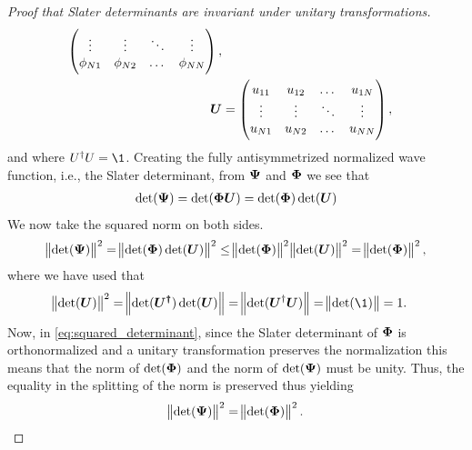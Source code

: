 \begin{proof}[Proof that Slater determinants are invariant under unitary
            transformations]
\begin{align}
\begin{pmatrix}
                    \vdots & \vdots & \ddots & \vdots \\
                    \phi_{N1} & \phi_{N2} & \dots & \phi_{NN}
                \end{pmatrix}, \\
                \boldsymbol{U}
                &= \begin{pmatrix}
                    u_{11} & u_{12} & \dots & u_{1N} \\
                    \vdots & \vdots & \ddots & \vdots \\
                    u_{N1} & u_{N2} & \dots & u_{NN}
                \end{pmatrix},
            \end{align}
            and where $U^{\dagger}U = \1$. Creating the fully antisymmetrized
            normalized wave function, i.e., the Slater determinant, from
            $\boldsymbol{\Psi}$ and $\boldsymbol{\Phi}$ we see that
            \begin{gather}
                \det(\boldsymbol{\Psi}) = \det(\boldsymbol{\Phi}\boldsymbol{U})
                = \det(\boldsymbol{\Phi})\det(\boldsymbol{U})
            \end{gather}
            We now take the squared norm on both sides.
            \begin{align}
                \norm{\det(\boldsymbol{\Psi})}^2
                = \norm{\det(\boldsymbol{\Phi})\det(\boldsymbol{U})}^2
                \leq
                \norm{\det(\boldsymbol{\Phi})}^2\norm{\det(\boldsymbol{U})}^2
                = \norm{\det(\boldsymbol{\Phi})}^2,
                \label{eq:squared_determinant}
            \end{align}
            where we have used that
            \begin{align}
                \norm{\det(\vfg{U})}^2
                &= \norm{\det(\vfg{U^{\dagger}})\det(\vfg{U})}
                = \norm{\det(\vfg{U}^{\dagger}\vfg{U})}
                = \norm{\det(\1)} = 1.
            \end{align}
            Now, in \autoref{eq:squared_determinant}, since the Slater
            determinant of $\boldsymbol{\Phi}$ is orthonormalized and a unitary
            transformation preserves the normalization this means that the norm
            of $\det(\boldsymbol{\Phi})$ and the norm of $\det(\boldsymbol{\Psi})$ must be
            unity.  Thus, the equality in the splitting of the norm is preserved
            thus yielding
            \begin{gather}
                \norm{\det(\boldsymbol{\Psi})}^2 = \norm{\det(\boldsymbol{\Phi})}^2.
            \end{gather}
        \end{proof}

